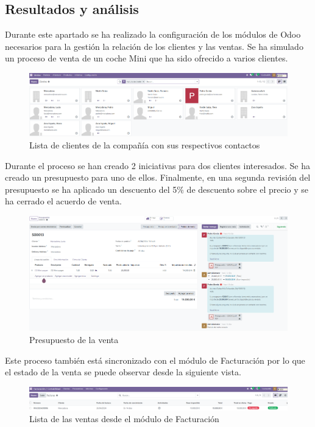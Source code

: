 \subsection{Resultados y análisis}
Durante este apartado se ha realizado la configuración de los módulos de Odoo necesarios para la gestión la relación de los clientes y las ventas. Se ha simulado un proceso de venta de un coche Mini que ha sido ofrecido a varios clientes.
\begin{figure}[h]
    \centering
    \includegraphics[width=1\linewidth]{fotosRelacion/clientes.png}
    \caption{Lista de clientes de la compañía con sus respectivos contactos}
    \label{fig:enter-label}
\end{figure}
Durante el proceso se han creado 2 iniciativas para dos clientes interesados. Se ha creado un presupuesto para uno de ellos. Finalmente, en una segunda revisión del presupuesto se ha aplicado un descuento del 5\% de descuento sobre el precio y se ha cerrado el acuerdo de venta.
\begin{figure}[h]
    \centering
    \includegraphics[width=1\linewidth]{fotosRelacion/presupuesto.png}
    \caption{Presupuesto de la venta}
    \label{fig:enter-label}
\end{figure}
Este proceso también está sincronizado con el módulo de Facturación por lo que el estado de la venta se puede observar desde la siguiente vista.
\newpage
\begin{figure}[h]
    \centering
    \includegraphics[width=1\linewidth]{fotosRelacion/facturacion.png}
    \caption{Lista de las ventas desde el módulo de Facturación}
    \label{fig:enter-label}
\end{figure}
